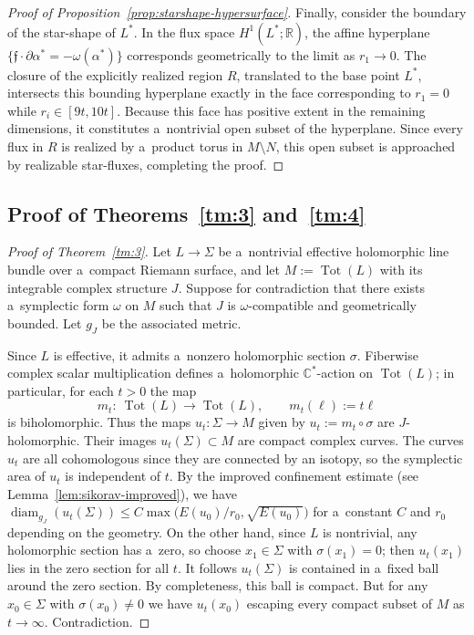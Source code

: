 \documentclass[pdftex]{sigma}
\numberwithin{equation}{section}
\newcommand{\bC}{{\mathbb C}}
\newcommand{\bR}{{\mathbb R}}
\DeclareMathOperator{\diam}{diam}
\DeclareMathOperator{\Tot}{Tot}
\theoremstyle{definition}
\begin{document}
\begin{proof}[Proof of Proposition~\ref{prop:starshape-hypersurface}]
 Finally, consider the boundary of the star-shape of $L^*$. In the flux space $H^1(L^*; \bR)$, the affine hyperplane $\{\mathfrak{f} \cdot \partial\alpha^* = -\omega(\alpha^*)\}$ corresponds geometrically to the limit as $r_1 \to 0$. The closure of the explicitly realized region $R$, translated to the base point $L^*$, intersects this bounding hyperplane exactly in the face corresponding to $r_1 = 0$ while $r_i \in [9t, 10t]$. Because this face has positive extent in the remaining dimensions, it constitutes a~nontrivial open subset of the hyperplane. Since every flux in $R$ is realized by a~product torus in $M\setminus N$, this open subset is approached by realizable star-fluxes, completing the proof.
 \end{proof}

\subsection{Proof of Theorems~\ref{tm:3} and~\ref{tm:4}}
\begin{proof}[Proof of Theorem~\ref{tm:3}]
Let $L\to \Sigma$ be a~nontrivial effective holomorphic line bundle over a~compact Riemann surface, and let $M:=\Tot(L)$ with its integrable complex structure $J$.
Suppose for contradiction that there exists a~symplectic form $\omega$ on $M$ such that $J$ is $\omega$-compatible and geometrically bounded.
Let $g_J$ be the associated metric.

Since $L$ is effective, it admits a~nonzero holomorphic section $\sigma$.
Fiberwise complex scalar multiplication defines a~holomorphic $\bC^{*}$-action on $\Tot(L)$; in particular, for each $t>0$ the map
\[
m_t\colon\ \Tot(L)\to \Tot(L),\qquad m_t(\ell):=t\ell
\]
is biholomorphic.
Thus the maps $u_t\colon \Sigma\to M$ given by $u_t:=m_t\circ \sigma$ are $J$-holomorphic.
Their images $u_t(\Sigma)\subset M$ are compact complex curves. The curves $u_t$ are all cohomologous since they are connected by an isotopy, so the symplectic area of $u_t$ is independent of $t$. By the improved confinement estimate (see Lemma~\ref{lem:sikorav-improved}), we have $\diam_{g_J}(u_t(\Sigma))\le C\max\bigl(E(u_0)/r_0,\sqrt{E(u_0)}\bigr)$ for a~constant $C$ and $r_0$ depending on the geometry.
On the other hand, since $L$ is nontrivial, any holomorphic section has a~zero, so choose $x_1\in \Sigma$ with $\sigma(x_1)=0$; then $u_t(x_1)$ lies in the zero section for all $t$. It follows $u_t(\Sigma)$ is contained in a~fixed ball around the zero section. By completeness, this ball is compact. But for any $x_0\in \Sigma$ with $\sigma(x_0)\neq 0$ we have $u_t(x_0)$ escaping every compact subset of $M$ as $t\to\infty$. Contradiction.
\end{proof}
\end{document}

